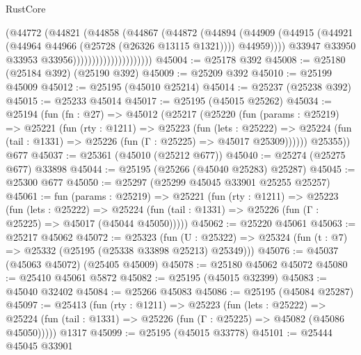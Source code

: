 \begin{lexlean}{RustCore}
\begin{coremodule}
                                      (@44772
                                        (@44821
                                          (@44858
                                            (@44867
                                              (@44872
                                                (@44894
                                                  (@44909
                                                    (@44915
                                                      (@44921
                                                        (@44964
                                                          @44966
                                                          (@25728 (@26326 @13115 @1321))))
                                                      @44959))))
                                              @33947
                                              @33950
                                              @33953
                                              @33956)))))))))))))))))))))
@45004 := @25178 @392
@45008 := @25180 (@25184 @392) (@25190 @392)
@45009 := @25209 @392
@45010 := @25199 @45009
@45012 := @25195 (@45010 @25214)
@45014 := @25237 (@25238 @392)
@45015 := @25233 @45014
@45017 := @25195 (@45015 @25262)
@45034 := @25194
    (fun (fn : @27) =>
    @45012
      (@25217
        (@25220
          (fun (params : @25219) =>
          @25221
            (fun (rty : @1211) =>
            @25223
              (fun (lets : @25222) =>
              @25224 (fun (tail : @1331) => @25226 (fun (Γ : @25225) => @45017 @25309))))))
        @25355))
    @677
@45037 := @25361 (@45010 (@25212 @677))
@45040 := @25274 (@25275 @677) @33898
@45044 := @25195 (@25266 (@45040 @25283) @25287)
@45045 := @25300 @677
@45050 := @25297 (@25299 @45045 @33901 @25255 @25257)
@45061 := fun (params : @25219) =>
  @25221
    (fun (rty : @1211) =>
    @25223
      (fun (lets : @25222) =>
      @25224 (fun (tail : @1331) => @25226 (fun (Γ : @25225) => @45017 (@45044 @45050)))))
@45062 := @25220 @45061
@45063 := @25217 @45062
@45072 := @25323
    (fun (U : @25322) => @25324 (fun (t : @7) => @25332 (@25195 (@25338 @33898 @25213) @25349)))
@45076 := @45037 (@45063 @45072) (@25405 @45009)
@45078 := @25180 @45062 @45072
@45080 := @25410 @45061 @5872
@45082 := @25195 (@45015 @32399)
@45083 := @45040 @32402
@45084 := @25266 @45083
@45086 := @25195 (@45084 @25287)
@45097 := @25413
    (fun (rty : @1211) =>
    @25223
      (fun (lets : @25222) =>
      @25224 (fun (tail : @1331) => @25226 (fun (Γ : @25225) => @45082 (@45086 @45050)))))
    @1317
@45099 := @25195 (@45015 @33778)
@45101 := @25444 @45045 @33901

\end{coremodule}
\end{lexlean}
